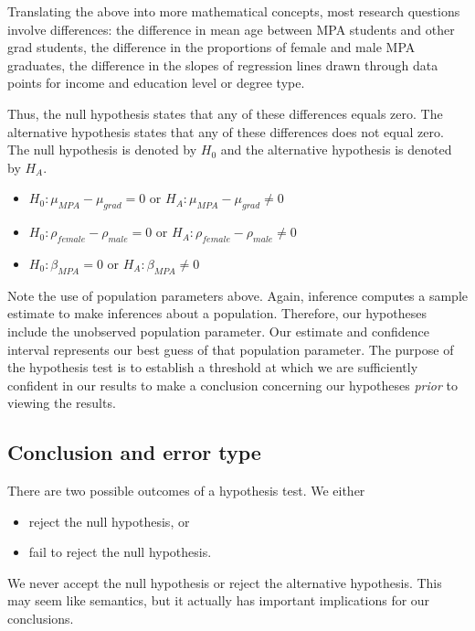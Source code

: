 \documentclass[
]{book}
\providecommand{\tightlist}{%
  \setlength{\itemsep}{0pt}\setlength{\parskip}{0pt}}
\begin{document}
Translating the above into more mathematical concepts, most research questions involve differences: the difference in mean age between MPA students and other grad students, the difference in the proportions of female and male MPA graduates, the difference in the slopes of regression lines drawn through data points for income and education level or degree type.

Thus, the null hypothesis states that any of these differences equals zero. The alternative hypothesis states that any of these differences does not equal zero. The null hypothesis is denoted by \(H_0\) and the alternative hypothesis is denoted by \(H_A\).

\begin{itemize}
\tightlist
\item
  \(H_0: \mu_{MPA}-\mu_{grad} = 0\) or \(H_A: \mu_{MPA}-\mu_{grad} \neq 0\)
\item
  \(H_0: \rho_{female}-\rho_{male} = 0\) or \(H_A: \rho_{female}-\rho_{male} \neq 0\)
\item
  \(H_0: \beta_{MPA} = 0\) or \(H_A: \beta_{MPA} \neq 0\)
\end{itemize}

Note the use of population parameters above. Again, inference computes a sample estimate to make inferences about a population. Therefore, our hypotheses include the unobserved population parameter. Our estimate and confidence interval represents our best guess of that population parameter. The purpose of the hypothesis test is to establish a threshold at which we are sufficiently confident in our results to make a conclusion concerning our hypotheses \emph{prior} to viewing the results.

\hypertarget{conclusion-and-error-type}{%
\subsection{Conclusion and error type}\label{conclusion-and-error-type}}

There are two possible outcomes of a hypothesis test. We either

\begin{itemize}
\tightlist
\item
  reject the null hypothesis, or
\item
  fail to reject the null hypothesis.
\end{itemize}

We never accept the null hypothesis or reject the alternative hypothesis. This may seem like semantics, but it actually has important implications for our conclusions.
\end{document}
